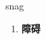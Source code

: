 
\begin{frame}
{\huge snag}
\begin{center}
\begin{enumerate}\Large
  \item \textbf{障碍}
\end{enumerate}
\end{center}
\end{frame}
